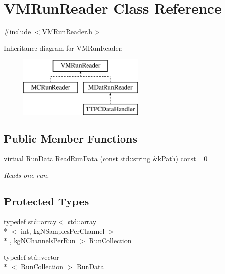 \hypertarget{class_v_m_run_reader}{\section{V\+M\+Run\+Reader Class Reference}
\label{class_v_m_run_reader}
}


{\ttfamily \#include $<$V\+M\+Run\+Reader.\+h$>$}

Inheritance diagram for V\+M\+Run\+Reader\+:\begin{figure}[H]
\begin{center}
\leavevmode
\includegraphics[height=3.000000cm]{class_v_m_run_reader}
\end{center}
\end{figure}
\subsection*{Public Member Functions}
\begin{DoxyCompactItemize}
\item 
virtual \hyperlink{class_v_m_run_reader_aa84c99e50235a10f563b3487b3930602}{Run\+Data} \hyperlink{class_v_m_run_reader_afe0f812890dcb11638a66c878f0d8765}{Read\+Run\+Data} (const std\+::string \&k\+Path) const =0
\begin{DoxyCompactList}\small\item\em Reads one run. \end{DoxyCompactList}\end{DoxyCompactItemize}
\subsection*{Protected Types}
\begin{DoxyCompactItemize}
\item 
typedef std\+::array$<$ std\+::array\\*
$<$ int, kg\+N\+Samples\+Per\+Channel $>$\\*
, kg\+N\+Channels\+Per\+Run $>$ \hyperlink{class_v_m_run_reader_aca02fe95a36b6651ad0cf4bc7a8d02e4}{Run\+Collection}
\item 
typedef std\+::vector\\*
$<$ \hyperlink{class_v_m_run_reader_aca02fe95a36b6651ad0cf4bc7a8d02e4}{Run\+Collection} $>$ \hyperlink{class_v_m_run_reader_aa84c99e50235a10f563b3487b3930602}{Run\+Data}
\end{DoxyCompactItemize}
